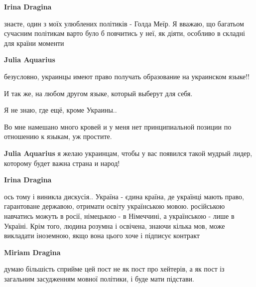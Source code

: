 \begin{itemize}
\begin{itemize}
\textbf{Irina Dragina} 

знаєте, один з моїх улюблених політиків - Голда Меїр. Я вважаю, що багатьом
сучасним політикам варто було б повчитись у неї, як діяти, особливо в складні
для країни моменти


 
\textbf{Julia Aquarius} 

безусловно, украинцы имеют право получать образование на украинском языке!!

И так же, на любом другом языке, который выберут для себя.

Я не знаю, где ещё, кроме Украины..

Во мне намешано много кровей и у меня нет принципиальной позиции по отношению к
языкам, уж простите.

 
\textbf{Julia Aquarius} я желаю украинцам, чтобы у вас появился такой мудрый лидер, которому будет важна страна и народ! 🙏🌸

 
\textbf{Irina Dragina} 

ось тому і виникла дискусія.. Україна - єдина країна, де українці мають право,
гарантоване державою, отримати освіту українською мовою. російською навчатись
можуть в росії, німецькою - в Німеччині, а українською - лише в Україні. Крім
того, людина розумна і освічена, знаючи кілька мов, може викладати іноземною,
якщо вона цього хоче і підписує контракт

 
\textbf{Miriam Dragina} 

думаю більшість сприйме цей пост не як пост про хейтерів, а як пост із
загальним засудженням мовної політики, і буде мати підстави.


\end{itemize}
\end{itemize}
